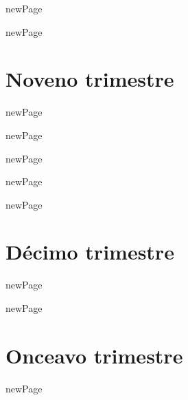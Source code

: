 \documentclass{book}
\begin{document}
\begin{htmlDiv}{newPage}
	
\end{htmlDiv}

\begin{htmlDiv}{newPage}
	
\end{htmlDiv}

\part{Noveno trimestre}

\begin{htmlDiv}{newPage}
	
\end{htmlDiv}

\begin{htmlDiv}{newPage}
	
\end{htmlDiv}

\begin{htmlDiv}{newPage}
	
\end{htmlDiv}

\begin{htmlDiv}{newPage}
	
\end{htmlDiv}

\begin{htmlDiv}{newPage}
	
\end{htmlDiv}

\part{Décimo trimestre}

\begin{htmlDiv}{newPage}
	
\end{htmlDiv}

\begin{htmlDiv}{newPage}
	
\end{htmlDiv}

\part{Onceavo trimestre}

\begin{htmlDiv}{newPage}
	
\end{htmlDiv}
\end{document}
